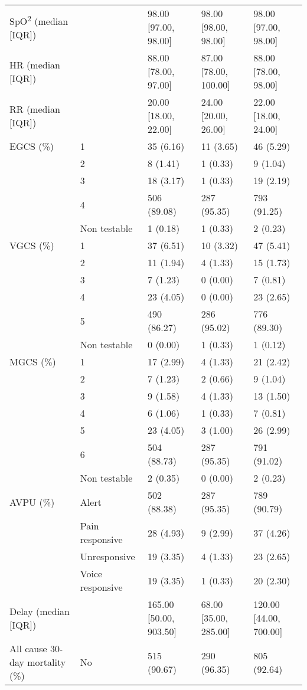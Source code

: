 \documentclass[10pt,letterpaper]{article}\usepackage[]{graphicx}\usepackage[]{color}
\begin{document}
\begin{table}[ht]
\begin{tabular}{lllll}
  SpO\textsuperscript{2} (median [IQR]) &  & 98.00 [97.00, 98.00] & 98.00 [98.00, 98.00] & 98.00 [97.00, 98.00] \\ 
  HR (median [IQR]) &  & 88.00 [78.00, 97.00] & 87.00 [78.00, 100.00] & 88.00 [78.00, 98.00] \\ 
  RR (median [IQR]) &  & 20.00 [18.00, 22.00] & 24.00 [20.00, 26.00] & 22.00 [18.00, 24.00] \\ 
  EGCS (\%) & 1 & 35 (6.16) & 11 (3.65) & 46 (5.29) \\ 
   & 2 & 8 (1.41) & 1 (0.33) & 9 (1.04) \\ 
   & 3 & 18 (3.17) & 1 (0.33) & 19 (2.19) \\ 
   & 4 & 506 (89.08) & 287 (95.35) & 793 (91.25) \\ 
   & Non testable & 1 (0.18) & 1 (0.33) & 2 (0.23) \\ 
  VGCS (\%) & 1 & 37 (6.51) & 10 (3.32) & 47 (5.41) \\ 
   & 2 & 11 (1.94) & 4 (1.33) & 15 (1.73) \\ 
   & 3 & 7 (1.23) & 0 (0.00) & 7 (0.81) \\ 
   & 4 & 23 (4.05) & 0 (0.00) & 23 (2.65) \\ 
   & 5 & 490 (86.27) & 286 (95.02) & 776 (89.30) \\ 
   & Non testable & 0 (0.00) & 1 (0.33) & 1 (0.12) \\ 
  MGCS (\%) & 1 & 17 (2.99) & 4 (1.33) & 21 (2.42) \\ 
   & 2 & 7 (1.23) & 2 (0.66) & 9 (1.04) \\ 
   & 3 & 9 (1.58) & 4 (1.33) & 13 (1.50) \\ 
   & 4 & 6 (1.06) & 1 (0.33) & 7 (0.81) \\ 
   & 5 & 23 (4.05) & 3 (1.00) & 26 (2.99) \\ 
   & 6 & 504 (88.73) & 287 (95.35) & 791 (91.02) \\ 
   & Non testable & 2 (0.35) & 0 (0.00) & 2 (0.23) \\ 
  AVPU (\%) & Alert & 502 (88.38) & 287 (95.35) & 789 (90.79) \\ 
   & Pain responsive & 28 (4.93) & 9 (2.99) & 37 (4.26) \\ 
   & Unresponsive & 19 (3.35) & 4 (1.33) & 23 (2.65) \\ 
   & Voice responsive & 19 (3.35) & 1 (0.33) & 20 (2.30) \\ 
  Delay (median [IQR]) &  & 165.00 [50.00, 903.50] & 68.00 [35.00, 285.00] & 120.00 [44.00, 700.00] \\ 
  All cause 30-day mortality (\%) & No & 515 (90.67) & 290 (96.35) & 805 (92.64) \\ 

\end{tabular}
\end{table}
\end{document}
